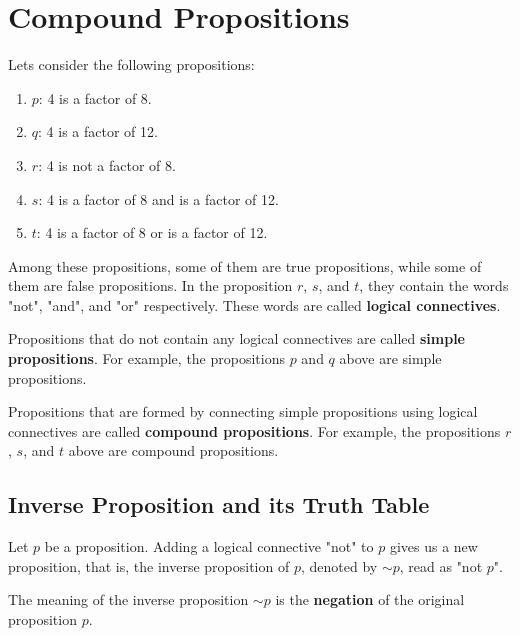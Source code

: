 \documentclass{report}
\begin{document}
\section*{Compound Propositions}

Lets consider the following propositions:
\begin{enumerate}[label=]
    \item $p$: 4 is a factor of 8.
    \item $q$: 4 is a factor of 12.
    \item $r$: 4 is not a factor of 8.
    \item $s$: 4 is a factor of 8 and is a factor of 12.
    \item $t$: 4 is a factor of 8 or is a factor of 12.
\end{enumerate}

Among these propositions, some of them are true propositions, while some of
them are false propositions. In the proposition $r$, $s$, and $t$, they contain
the words "not", "and", and "or" respectively. These words are called
\textbf{logical connectives}.

Propositions that do not contain any logical connectives are called
\textbf{simple propositions}. For example, the propositions $p$ and $q$ above
are simple propositions.

Propositions that are formed by connecting simple propositions using logical
connectives are called \textbf{compound propositions}. For example, the
propositions $r$, $s$, and $t$ above are compound propositions.

\subsection*{Inverse Proposition and its Truth Table}

Let $p$ be a proposition. Adding a logical connective "not" to $p$ gives us a
new proposition, that is, the inverse proposition of $p$, denoted by $\sim p$,
read as "not $p$".

The meaning of the inverse proposition $\sim p$ is the \textbf{negation} of the
original proposition $p$.
\end{document}

